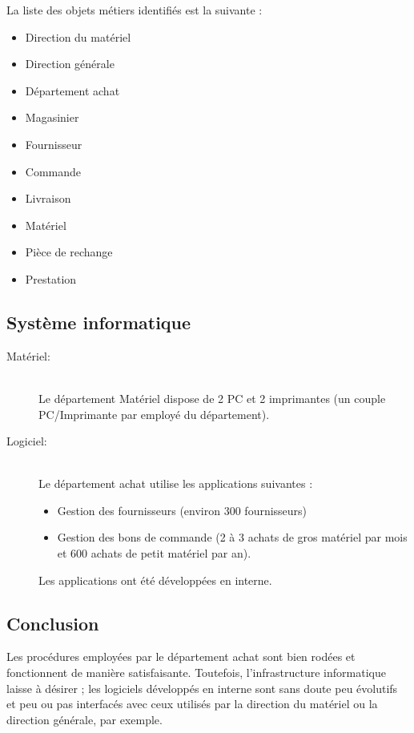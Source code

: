 \documentclass[twoside]{article}
\newcommand\el{\hfill\\}
\begin{document}
La liste des objets métiers identifiés est la suivante :

\begin{itemize}
\item Direction du matériel
\item Direction générale
\item Département achat
\item Magasinier
\item Fournisseur
\item Commande
\item Livraison
\item Matériel
\item Pièce de rechange
\item Prestation
\end{itemize}


\subsection{Système informatique}

\begin{description}
    \item [Matériel:]\el
Le département Matériel dispose de 2 PC et 2 imprimantes (un couple
PC/Imprimante par employé du département).

    \item [Logiciel:]\el
Le département achat utilise les applications suivantes :
    \begin{itemize}
\item Gestion des fournisseurs (environ 300 fournisseurs)
\item Gestion des bons de commande (2 à 3 achats de gros matériel par mois
        et 600 achats de petit matériel par an).
    \end{itemize}

Les applications ont été développées en interne.

\end{description}

\subsection{Conclusion}

Les procédures employées par le département achat sont bien rodées et
fonctionnent de manière satisfaisante. Toutefois, l'infrastructure
informatique laisse à désirer ; les logiciels développés en interne sont
sans doute peu évolutifs et peu ou pas interfacés avec ceux utilisés par la
direction du matériel ou la direction générale, par exemple.
\end{document}
